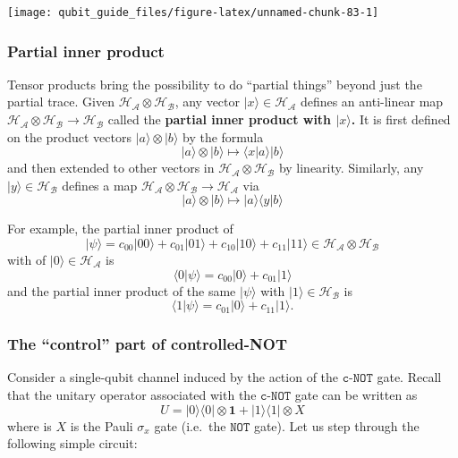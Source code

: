\documentclass[fleqn,a4paper]{article}
\theoremstyle{definition}
\theoremstyle{definition}
\theoremstyle{definition}
\theoremstyle{definition}
\theoremstyle{remark}
\begin{document}
\begin{center}\texttt{[image: qubit\_guide\_files/figure-latex/unnamed-chunk-83-1]} \end{center}

\hypertarget{partial-inner-product}{%
\subsubsection{Partial inner product}\label{partial-inner-product}}

Tensor products bring the possibility to do ``partial things'' beyond just the partial trace.
Given \(\mathcal{H}_{\mathcal{A}}\otimes\mathcal{H}_{\mathcal{B}}\), any vector \(|x\rangle\in\mathcal{H}_{\mathcal{A}}\) defines an anti-linear map \(\mathcal{H}_{\mathcal{A}}\otimes\mathcal{H}_{\mathcal{B}}\to\mathcal{H}_{\mathcal{B}}\) called the \textbf{partial inner product with \(|x\rangle\).}
It is first defined on the product vectors \(|a\rangle\otimes|b\rangle\) by the formula
\[
  |a\rangle\otimes|b\rangle
  \longmapsto \langle x|a\rangle|b\rangle
\]
and then extended to other vectors in \(\mathcal{H}_{\mathcal{A}}\otimes\mathcal{H}_{\mathcal{B}}\) by linearity.
Similarly, any \(|y\rangle\in\mathcal{H}_{\mathcal{B}}\) defines a map \(\mathcal{H}_{\mathcal{A}}\otimes\mathcal{H}_{\mathcal{B}}\to\mathcal{H}_{\mathcal{A}}\) via
\[
  |a\rangle\otimes|b\rangle
  \longmapsto |a\rangle\langle y|b\rangle
\]

For example, the partial inner product of
\[
  |\psi\rangle=c_{00}|00\rangle+c_{01}|01\rangle+c_{10}|10\rangle+c_{11}|11\rangle\in\mathcal{H}_{\mathcal{A}}\otimes\mathcal{H}_{\mathcal{B}}
\]
with of \(|0\rangle\in\mathcal{H}_{\mathcal{A}}\) is
\[
  \langle 0|\psi\rangle = c_{00}|0\rangle + c_{01}|1\rangle
\]
and the partial inner product of the same \(|\psi\rangle\) with \(|1\rangle\in\mathcal{H}_{\mathcal{B}}\) is
\[
  \langle 1|\psi\rangle = c_{01}|0\rangle + c_{11}|1\rangle.
\]

\hypertarget{control-controlled-NOT}{%
\subsubsection{The ``control'' part of controlled-NOT}\label{control-controlled-NOT}}

Consider a single-qubit channel induced by the action of the \(\texttt{c-NOT}\) gate.
Recall that the unitary operator associated with the \(\texttt{c-NOT}\) gate can be written as
\[
  U = |0\rangle\langle 0|\otimes\mathbf{1}+ |1\rangle\langle 1|\otimes X
\]
where is \(X\) is the Pauli \(\sigma_x\) gate (i.e.~the \(\texttt{NOT}\) gate).
Let us step through the following simple circuit:
\end{document}
